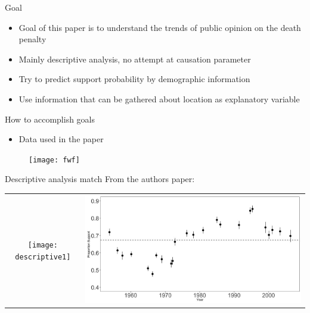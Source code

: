\documentclass{beamer}
\title{}
\subtitle{Hierarchical models for estimating state and
	demographic trends in US death penalty public
	opinion}
\date{\today}
\begin{document}
	\begin{frame}
		\maketitle
	\end{frame}
	
	\begin{frame}{Goal}
		\begin{itemize}
			\item Goal of this paper is to understand the trends of public opinion on the death penalty
			\item Mainly descriptive analysis, no attempt at causation parameter
			\item Try to predict support probability by demographic information
			\item Use information that can be gathered about location as explanatory variable
		\end{itemize}
	\end{frame}
	
	\begin{frame}{How to accomplish goals}
		\begin{itemize}
			\item Data used in the paper
		\end{itemize}
		\begin{figure}
			\centering 
			\texttt{[image: fwf]}
		\end{figure}
	\end{frame}
	
	\begin{frame}{Descriptive analysis match}
		From the authors paper:
		\begin{tabular}{cc}
				\texttt{[image: descriptive1]} & 						\includegraphics[scale=.15]{mydescriptive1} \\
		\end{tabular}
		\begin{figure}
			\centering

		\end{figure}
	\end{frame}
	
\end{document}

